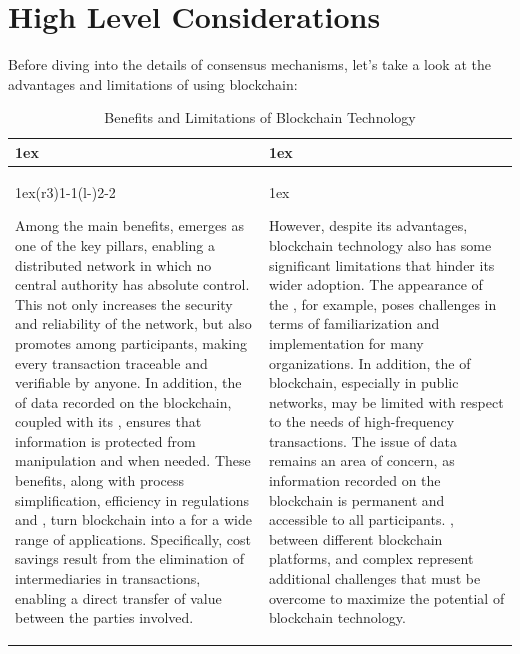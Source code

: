 \section{High Level Considerations}

Before diving into the details of consensus mechanisms, let's take a look at the advantages and limitations of using blockchain:

\begin{table}[h]
\begin{tabularx}{\linewidth}{>{\parskip1ex}X@{\kern4\tabcolsep}>{\parskip1ex}X}
\toprule
\hfil\bfseries \color{Orange}{Pros}
&
\hfil\bfseries \color{Orange}{Cons}
\\\cmidrule(r{3\tabcolsep}){1-1}\cmidrule(l{-\tabcolsep}){2-2}

Among the main benefits, \textbf{\color{Blue}{decentralization}} emerges as one of the key pillars, enabling a distributed network in which no central authority has absolute control. This not only increases the security and reliability of the network, but also promotes \textbf{\color{Blue}{transparency and trust}} among participants, making every transaction traceable and verifiable by anyone. In addition, the \textbf{\color{Blue}{immutability}} of data recorded on the blockchain, coupled with its \textbf{\color{Blue}{high availability}}, ensures that information is protected from manipulation and \textbf{\color{Blue}{always accessible}} when needed. These benefits, along with process simplification, efficiency in regulations and \textbf{\color{Blue}{cost savings}}, turn blockchain into a \textbf{\color{Blue}{reliable and programmable platform}} for a wide range of applications. Specifically, cost savings result from the elimination of intermediaries in transactions, enabling a direct transfer of value between the parties involved.
&

However, despite its advantages, blockchain technology also has some significant limitations that hinder its wider adoption. The appearance of the \textbf{\color{Blue}{new technology}}, for example, poses challenges in terms of familiarization and implementation for many organizations. In addition, the \textbf{\color{Blue}{scalability}} of blockchain, especially in public networks, may be limited with respect to the needs of high-frequency transactions. The issue of data \textbf{\color{Blue}{privacy and confidentiality}} remains an area of concern, as information recorded on the blockchain is permanent and accessible to all participants. \textbf{\color{Blue}{Limited adoption}}, \textbf{\color{Blue}{interoperability}} between different blockchain platforms, and complex \textbf{\color{Blue}{regulatory issues}} represent additional challenges that must be overcome to maximize the potential of blockchain technology.
\\\bottomrule
\end{tabularx}
\caption{Benefits and Limitations of Blockchain Technology}
\end{table}

